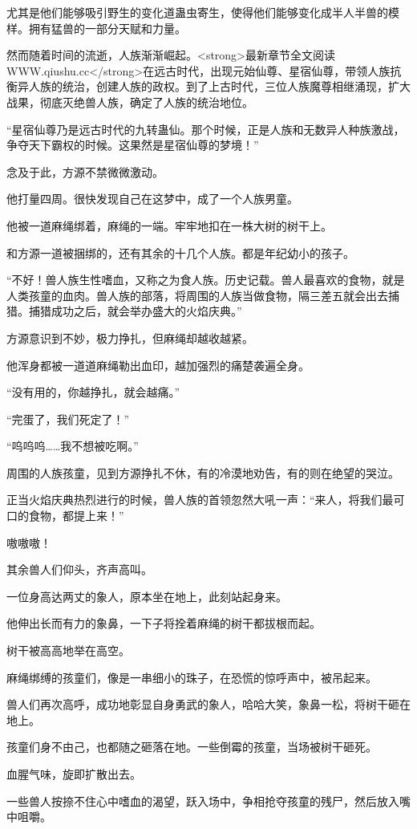 \begin{this_body}
尤其是他们能够吸引野生的变化道蛊虫寄生，使得他们能够变化成半人半兽的模样。拥有猛兽的一部分天赋和力量。

然而随着时间的流逝，人族渐渐崛起。<strong>最新章节全文阅读WWW.qiushu.cc</strong>在远古时代，出现元始仙尊、星宿仙尊，带领人族抗衡异人族的统治，创建人族的政权。到了上古时代，三位人族魔尊相继涌现，扩大战果，彻底灭绝兽人族，确定了人族的统治地位。

“星宿仙尊乃是远古时代的九转蛊仙。那个时候，正是人族和无数异人种族激战，争夺天下霸权的时候。这果然是星宿仙尊的梦境！”

念及于此，方源不禁微微激动。

他打量四周。很快发现自己在这梦中，成了一个人族男童。

他被一道麻绳绑着，麻绳的一端。牢牢地扣在一株大树的树干上。

和方源一道被捆绑的，还有其余的十几个人族。都是年纪幼小的孩子。

“不好！兽人族生性嗜血，又称之为食人族。历史记载。兽人最喜欢的食物，就是人类孩童的血肉。兽人族的部落，将周围的人族当做食物，隔三差五就会出去捕猎。捕猎成功之后，就会举办盛大的火焰庆典。”

方源意识到不妙，极力挣扎，但麻绳却越收越紧。

他浑身都被一道道麻绳勒出血印，越加强烈的痛楚袭遍全身。

“没有用的，你越挣扎，就会越痛。”

“完蛋了，我们死定了！”

“呜呜呜……我不想被吃啊。”

周围的人族孩童，见到方源挣扎不休，有的冷漠地劝告，有的则在绝望的哭泣。

正当火焰庆典热烈进行的时候，兽人族的首领忽然大吼一声：“来人，将我们最可口的食物，都提上来！”

嗷嗷嗷！

其余兽人们仰头，齐声高叫。

一位身高达两丈的象人，原本坐在地上，此刻站起身来。

他伸出长而有力的象鼻，一下子将拴着麻绳的树干都拔根而起。

树干被高高地举在高空。

麻绳绑缚的孩童们，像是一串细小的珠子，在恐慌的惊呼声中，被吊起来。

兽人们再次高呼，成功地彰显自身勇武的象人，哈哈大笑，象鼻一松，将树干砸在地上。

孩童们身不由己，也都随之砸落在地。一些倒霉的孩童，当场被树干砸死。

血腥气味，旋即扩散出去。

一些兽人按捺不住心中嗜血的渴望，跃入场中，争相抢夺孩童的残尸，然后放入嘴中咀嚼。


\end{this_body}
